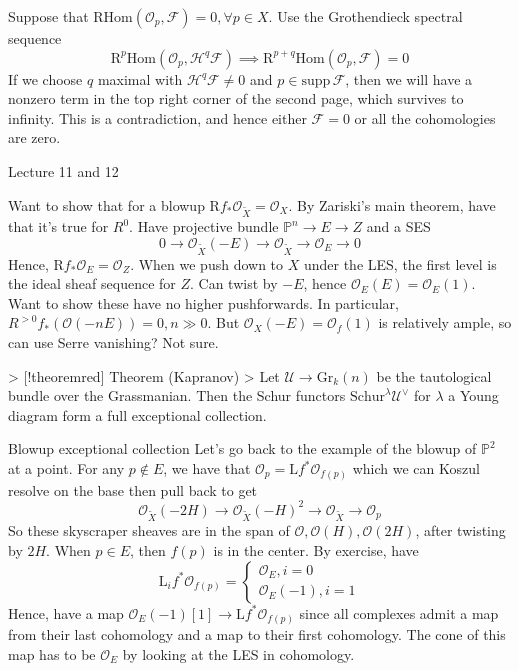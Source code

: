 Suppose that $\mathrm{RHom}(\mathcal{O}_{p}, \mathcal{F})=0,\forall p \in X$. Use the Grothendieck spectral sequence $$\mathrm{R}^p\mathrm{Hom}(\mathcal{O}_{p}, \mathcal{H}^q \mathcal{F})\implies \mathrm{R}^{p+q}\mathrm{Hom}(\mathcal{O}_{p},\mathcal{F})=0 $$If we choose $q$ maximal with $\mathcal{H}^q\mathcal{F}\neq 0$ and $p\in \mathrm{supp}\,\mathcal{F}$, then we will have a nonzero term in the top right corner of the second page, which survives to infinity. This is a contradiction, and hence either $\mathcal{F}=0$ or all the cohomologies are zero. 

 Lecture 11 and 12

Want to show that for a blowup $\mathrm{R}f_{*}\mathcal{O}_{\tilde{X}}=\mathcal{O}_{X}$. By Zariski's main theorem, have that it's true for $R^0$. Have projective bundle $\mathbb{P}^n\xrightarrow{}E\xrightarrow{}Z$ and a SES $$0\xrightarrow{}\mathcal{O}_{\tilde{X}}(-E)\xrightarrow{}\mathcal{O}_{\tilde{ X}}\xrightarrow{}\mathcal{O}_{E}\xrightarrow{ }0$$Hence, $\mathrm{R}f_{*}\mathcal{O}_{E}=\mathcal{O}_{Z}$. When we push down to $X$ under the LES, the first level is the ideal sheaf sequence for $Z$. Can twist by $-E$, hence $\mathcal{O}_{E}(E)=\mathcal{O}_{E}(1)$. Want to show these have no higher pushforwards. In particular, $R^{>0}f_{*}(\mathcal{O}(-nE))=0, n\gg 0$. But $\mathcal{O}_{X}(-E)=\mathcal{O}_{f}(1)$ is relatively ample, so can use Serre vanishing? Not sure.

> [!theoremred] Theorem (Kapranov) 
> Let $\mathcal{U}\xrightarrow{}\mathrm{Gr}_{k}(n)$ be the tautological bundle over the Grassmanian. Then the Schur functors $\mathrm{Schur}^\lambda \mathcal{U}^\lor$ for $\lambda$ a Young diagram form a full exceptional collection.

 Blowup exceptional collection
Let's go back to the example of the blowup of $\mathbb{P}^2$ at a point. For any $p\notin E$, we have that $\mathcal{O}_{p}=\mathrm{L}f^*\mathcal{O}_{f(p)}$ which we can Koszul resolve on the base then pull back to get $$\mathcal{O}_{\tilde{X}}(-2H)\xrightarrow{}\mathcal{O}_{\tilde{ X}}(-H)^2\xrightarrow{}\mathcal{O}_{\tilde{X}}\xrightarrow{}\mathcal{O}_{p}$$So these skyscraper sheaves are in the span of $\mathcal{O},\mathcal{O}(H),\mathcal{O}(2H)$, after twisting by $2H$. When $p\in E$, then $f(p)$ is in the center. By exercise, have $$\mathrm{L}_{i}f^*\mathcal{O}_{f(p)}=\begin{cases}
\mathcal{O}_{E},i=0 \\
\mathcal{O}_{E}(-1), i=1
\end{cases}$$
Hence, have a map $\mathcal{O}_{E}(-1)[1]\xrightarrow{}\mathrm{L}f^*\mathcal{O}_{f(p)}$ since all complexes admit a map from their last cohomology and a map to their first cohomology. The cone of this map has to be $\mathcal{O}_{E}$ by looking at the LES in cohomology. 

